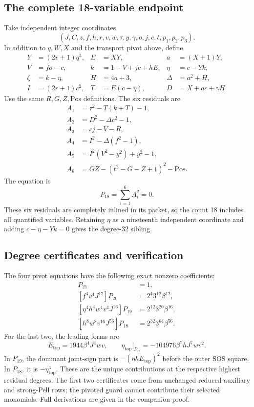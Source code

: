 \subsection{The complete 18-variable endpoint}
Take independent integer coordinates
\[
 (J,C,z,f,h,r,v,w,\tau,y,\gamma,o,j,c,t,p_1,p_2,p_3).
\]
In addition to $q,W,X$ and the transport pivot above, define
\begin{align*}
 Y&=(2v+1)q^3,& E&=XY,& a&=(X+1)Y,\\
 V&=fo-c,& k&=1-V+jc+hE,& \eta&=c-Yk,\\
 \zeta&=k-\eta,& H&=4a+3,& \Delta&=a^2+H,\\
 I&=(2r+1)c^2,& T&=E(c-\eta),& D&=X+ac+\gamma H.
\end{align*}
Use the same $R,G,Z,\mathrm{Pos}$ definitions. The six residuals are
\begin{align*}
 A_1&=\tau^2-T(k+T)-1,\\
 A_2&=D^2-\Delta c^2-1,\\
 A_3&=cj-V-R,\\
 A_4&=I^2-\Delta(f^2-1),\\
 A_5&=I^2(V^2-y^2)+y^2-1,\\
 A_6&=GZ-(t^2-G-Z+1)^2-\mathrm{Pos}.
\end{align*}
The equation is
\[
 \boxed{\displaystyle P_{18}=\sum_{i=1}^{6}A_i^2=0.}
\]
These six residuals are completely inlined in its packet, so the count
18 includes all quantified variables. Retaining $\eta$ as a nineteenth
independent coordinate and adding $c-\eta-Yk=0$ gives the degree-32 sibling.

\subsection{Degree certificates and verification}
The four pivot equations have the following exact nonzero coefficients:
\begin{align*}
 [a^4f^8o^4]P_{21}&=1,\\
 [f^4v^4J^{12}]P_{20}&=2^4 3^{12}\beta^{12},\\
 [\eta^4h^4w^4v^4J^{16}]P_{19}&=2^{12}3^{20}\beta^{16},\\
 [h^8w^8v^{16}J^{56}]P_{18}&=2^{32}3^{64}\beta^{56}.
\end{align*}
For the last two, the leading forms are
\[
 E_{\mathrm{top}}=1944\beta^4J^4wv,
 \qquad \eta_{\mathrm{top}}\big|_{P_{18}}
   =-104976\beta^7hJ^7wv^2.
\]
In $P_{19}$, the dominant joint-sign part is
$-(\eta hE_{\mathrm{top}})^2$ before the outer SOS square. In $P_{18}$,
it is $-\eta_{\mathrm{top}}^4$. These are the unique contributions at
the respective highest residual degrees. The first two certificates come
from unchanged reduced-auxiliary and strong-Pell rows; the pivoted guard
cannot contribute their selected monomials. Full derivations are given in
the companion proof.

